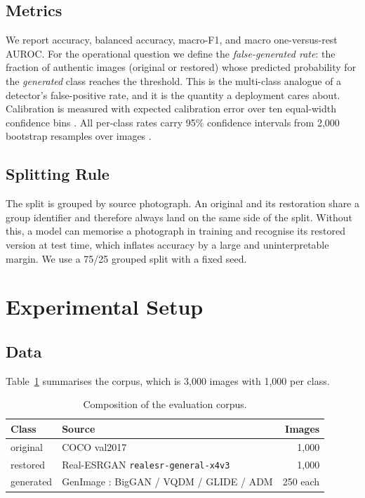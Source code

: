 ﻿\documentclass[graybox,norunningheads]{svmult}
\begin{document}
\subsection{Metrics}

We report accuracy, balanced accuracy, macro-F1, and macro one-versus-rest AUROC. For
the operational question we define the \emph{false-generated rate}: the fraction of
authentic images (original or restored) whose predicted probability for the
\emph{generated} class reaches the threshold. This is the multi-class analogue of a
detector's false-positive rate, and it is the quantity a deployment cares about.
Calibration is measured with expected calibration error over ten equal-width
confidence bins \cite{guo2017calibration}. All per-class rates carry 95\% confidence
intervals from 2{,}000 bootstrap resamples over images \cite{efron1993bootstrap}.

\subsection{Splitting Rule}

The split is grouped by source photograph. An original and its restoration share a
group identifier and therefore always land on the same side of the split. Without
this, a model can memorise a photograph in training and recognise its restored
version at test time, which inflates accuracy by a large and uninterpretable margin.
We use a 75/25 grouped split with a fixed seed.

\section{Experimental Setup}

\subsection{Data}

Table~\ref{tab:data} summarises the corpus, which is 3{,}000 images with 1{,}000 per
class.

\begin{table}[t]
\centering
\caption{Composition of the evaluation corpus.}
\label{tab:data}
\begin{tabular}{@{}llr@{}}
\toprule
Class & Source & Images \\
\midrule
original  & COCO val2017 \cite{lin2014coco} & 1{,}000 \\
restored  & Real-ESRGAN \texttt{realesr-general-x4v3} \cite{wang2021realesrgan} & 1{,}000 \\
generated & GenImage \cite{zhu2023genimage}: BigGAN / VQDM / GLIDE / ADM & 250 each \\
\bottomrule
\end{tabular}
\end{table}
\end{document}
